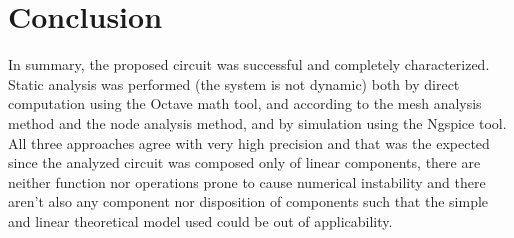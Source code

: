\section{Conclusion}
\label{sec:conclusion}

In summary, the proposed circuit was successful and completely characterized. Static analysis was performed (the system is not dynamic) both by direct computation using the Octave math tool, and according to the mesh analysis method and the node analysis method, and by simulation using the Ngspice tool. All three approaches agree with very high precision and that was the expected since the analyzed circuit was composed only of linear components, there are neither function nor operations prone to cause numerical instability and there aren’t also any component nor disposition of components such that the simple and linear theoretical model used could be out of applicability.

